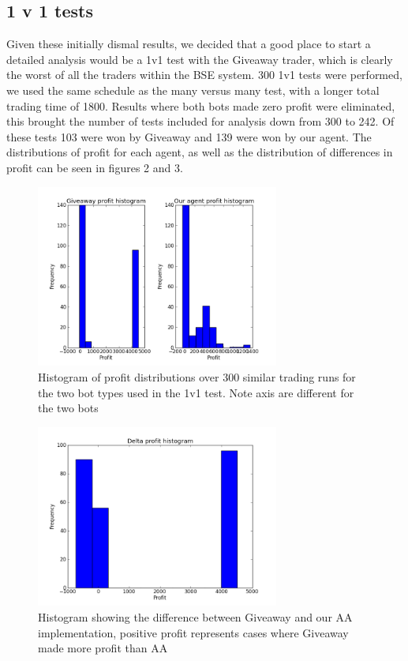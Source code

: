 \documentclass{acm_proc_article-sp}
\begin{document}
\subsection{1 v 1 tests} Given these initially dismal results, we decided that
a good place to start a detailed analysis would be a 1v1 test with the Giveaway
trader, which is clearly the worst of all the traders within the BSE system.
300 1v1 tests were performed, we used the same schedule as the many versus many
test, with a longer total trading time of 1800. Results where both bots made
zero profit were eliminated, this brought the number of tests included for
analysis down from 300 to 242. Of these tests 103 were won by Giveaway and 139
were won by our agent. The distributions of profit for each agent, as well as
the distribution of differences in profit can be seen in figures 2 and 3.

\begin{figure}[h!] \includegraphics[width=80mm]{giveaway_1_v_1.png}
\caption{Histogram of profit distributions over 300 similar trading runs for
the two bot types used in the 1v1 test. Note axis are different for the two
bots} \end{figure}

\begin{figure}[h!] \includegraphics[width=80mm]{giveaway_1_v_1_delta.png}
\caption {Histogram showing the difference between Giveaway and our AA implementation,
positive profit represents cases where Giveaway made more profit than AA}
\end{figure}
\end{document}
